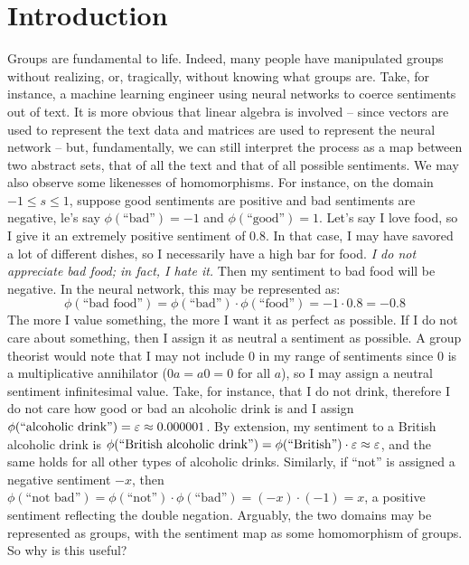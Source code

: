\section{Introduction}\label{sec:intro}

Groups are fundamental to life.
Indeed, many people have manipulated groups without realizing,
or, tragically, without knowing what groups are.
Take, for instance, a machine learning engineer using
neural networks to coerce sentiments out of text.
It is more obvious that linear algebra is involved --
since vectors are used to represent the text data
and matrices are used to represent the neural network --
but, fundamentally, we can still interpret the process as
a map between two abstract sets, that of all the text
and that of all possible sentiments.
We may also observe some likenesses of homomorphisms.
For instance, on the domain $-1 \le s \le 1$,
suppose good sentiments are positive and bad sentiments are negative,
le's say $\phi(\text{``bad''}) = -1$ and $\phi(\text{``good''}) = 1$.
Let's say I love food, so I give it an extremely positive sentiment of $0.8$.
In that case, I may have savored a lot of different dishes, so I
necessarily have a high bar for food. \emph{I do not appreciate bad food;
in fact, I hate it.} Then my sentiment to bad food will be negative.
In the neural network, this may be represented as:
\[
  \phi(\text{``bad food''}) = \phi(\text{``bad''}) \cdot \phi(\text{``food''}) = -1 \cdot 0.8 = -0.8
\]
The more I value something, the more I want it as perfect as possible.
If I do not care about something, then I assign it as neutral a sentiment as possible.
A group theorist would note that I may not include $0$ in my range of sentiments
since $0$ is a multiplicative annihilator ($0a = a0 = 0$ for all $a$),
so I may assign a neutral sentiment infinitesimal value.
Take, for instance, that I do not drink, therefore I do not care how good
or bad an alcoholic drink is and I assign $\phi(\text{``alcoholic drink''}) = \varepsilon \approx 0.000001$.
By extension, my sentiment to a British alcoholic drink is
$\phi(\text{``British alcoholic drink''}) = \phi(\text{``British''}) \cdot \varepsilon \approx \varepsilon$,
and the same holds for all other types of alcoholic drinks.
Similarly, if ``not'' is assigned a negative sentiment $-x$,
then $\phi(\text{``not bad''}) = \phi(\text{``not''}) \cdot \phi(\text{``bad''})
= (-x) \cdot (-1) = x$, a positive sentiment reflecting the double negation.
Arguably, the two domains may be represented as groups, with the
sentiment map as some homomorphism of groups.
So why is this useful?


